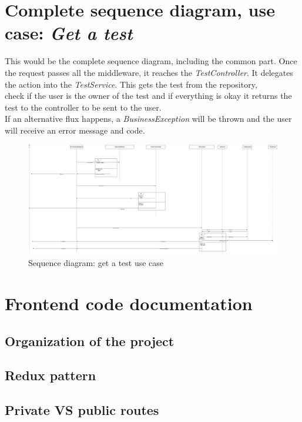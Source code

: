     \section{Complete sequence diagram, use case: \textit{Get a test}}
    This would be the complete sequence diagram, including the common part. Once the request passes all the middleware, it reaches the \textit{TestController}. It delegates the action into the \textit{TestService}. This gets the test from the repository, \\ 
    check if the user is the owner of the test and if everything is okay it returns the test to the controller to be sent to the user. \\
    If an alternative flux happens, a \textit{BusinessException} will be thrown and the user will receive an error message and code.
        \newpage
        \begin{figure}[H]
            \centering
                \includegraphics[angle=90, width=\textwidth, height=\textheight]{assets/diagrams/getatest.png}
            \caption{Sequence diagram: get a test use case}
            \label{fig:implementation_getatest}
        \end{figure}

\newpage
\section{Frontend code documentation}
    \subsection{Organization of the project}
    \subsection{Redux pattern}
    \subsection{Private VS public routes}
